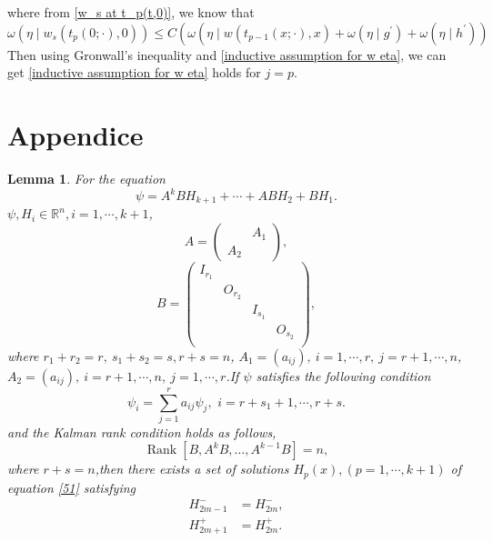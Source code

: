 \documentclass[a4paper,reqno,11pt]{amsart}
\numberwithin{equation}{section} %
\newtheorem{lem}{Lemma}[section]
\begin{document}
where from \eqref{w_s at t_p(t,0)}, we know that
$$
\omega \left( \eta \mid w_s\left( t_p\left( 0;\cdot \right) ,0 \right) \right) \leqslant C\left( \omega \left( \eta \mid w\left( t_{p-1}\left( x;\cdot \right) ,x \right) +\omega \left( \eta \mid g^{\prime} \right) +\omega \left( \eta \mid h^{\prime} \right) \right) \right. 
$$
Then using Gronwall's inequality and \eqref{inductive assumption for w eta}, we can get \eqref{inductive assumption for w eta} holds for $j=p$.





\section{Appendice}
\begin{lem}\label{l50}
	For the equation
	\begin{equation}\label{51}
		\psi =A^kBH_{k+1} +\cdots +ABH_2 +BH_1.
	\end{equation}
	$\psi , H_i \in \mathbb{R} ^n ,i = 1,\cdots,k+1$,
	$$
	A=\left(\begin{array}{ll} 
		& A_1 \\
		A_2 &
	\end{array}\right),
	$$
	$$
	B=\left( \begin{matrix}
		I_{r_1}&		&		&		\\
		&		O_{r_2}&		&		\\
		&		&		I_{s_1}&		\\
		&		&		&		O_{s_2}\\
	\end{matrix} \right) ,
	$$
	where $r_1 +r_2 =r,\ s_1+s_2=s, r+s=n $, $A_1=\left( a_{ij} \right) ,\ i=1,\cdots ,r,\ j=r+1,\cdots ,n$, $A_2=\left( a_{ij} \right) ,\ i=r+1,\cdots ,n,\ j=1,\cdots ,r$.If $\psi$ satisfies the following condition
	\begin{equation}\label{52}
		\psi _i=\sum_{j=1}^r{a_{ij}\psi _j ,\,\,i=r+s_1+1,\cdots ,r+s.}
	\end{equation}
	and the Kalman rank condition holds as follows,
	\begin{equation}\label{53}
		\operatorname{Rank}\left[B, A^k B, \ldots, A^{k-1} B\right]=n,
	\end{equation}
	where $r+s=n$,then there exists a set of solutions $H_p (x), (p = 1, \cdots , k+1)$ of equation \eqref{51} satisfying
	\begin{align}
		H^{-}_{2m-1} &= H^{-}_{2m}\label{55} ,\\
		H^{+}_{2m+1} &= H^{+}_{2m}\label{56} .
	\end{align}
\end{lem}
\end{document}
